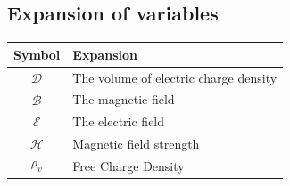 \subsection{Expansion of variables}



\begin{center}
\begin{tabular}{ | m{5cm} | m{5cm} | } 
  \hline
  \textbf{Symbol} & \textbf{Expansion}  \\ 
  \hline
  $$\mathcal{D}$$ & The volume of electric charge density \\ 
  \hline
  $$\mathcal{B}$$ & The magnetic field \\  
  \hline
  $$\mathcal{E}$$ & The electric field \\  
  \hline
  $$\mathcal{H}$$ & Magnetic field strength \\  
  \hline
  $$\rho_{v}$$ & Free Charge Density\\
  \hline
\end{tabular}
\end{center}
